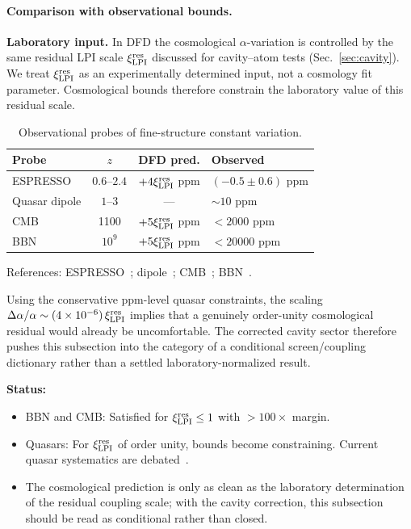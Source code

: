 \paragraph{Comparison with observational bounds.}

\textbf{Laboratory input.}
In DFD the cosmological $\alpha$-variation is controlled by the same residual LPI scale $\xi_{\rm LPI}^{\rm res}$ discussed for cavity--atom tests (Sec.~\ref{sec:cavity}). We treat $\xi_{\rm LPI}^{\rm res}$ as an experimentally determined input, not a cosmology fit parameter. Cosmological bounds therefore constrain the laboratory value of this residual scale.

\begin{table}[h]
\centering
\caption{Observational probes of fine-structure constant variation.}\label{tab:alpha-variation}
\begin{ruledtabular}
\scriptsize
\begin{tabular}{lccl}
\textbf{Probe} & $z$ & \textbf{DFD pred.} & \textbf{Observed} \\
\hline
ESPRESSO & $0.6$--$2.4$ & $+4\xi_{\rm LPI}^{\rm res}$ ppm & $(-0.5 \pm 0.6)$ ppm \\
Quasar dipole & $1$--$3$ & --- & $\sim10$ ppm \\
CMB & 1100 & $+5\xi_{\rm LPI}^{\rm res}$ ppm & $<2000$ ppm \\
BBN & $10^9$ & $+5\xi_{\rm LPI}^{\rm res}$ ppm & $<20000$ ppm \\
\end{tabular}
\end{ruledtabular}
\vspace{1mm}
{\scriptsize References: ESPRESSO~\cite{Murphy2022ESPRESSO}; dipole~\cite{Webb2011,Whitmore2015}; CMB~\cite{Planck2018VI}; BBN~\cite{Cyburt2016}.}
\end{table}

Using the conservative ppm-level quasar constraints, the scaling $\Delta\alpha/\alpha \sim (4\times 10^{-6})\,\xi_{\rm LPI}^{\rm res}$ implies that a genuinely order-unity cosmological residual would already be uncomfortable. The corrected cavity sector therefore pushes this subsection into the category of a conditional screen/coupling dictionary rather than a settled laboratory-normalized result.

\textbf{Status:}
\begin{itemize}
\item BBN and CMB: Satisfied for $\xi_{\rm LPI}^{\rm res} \leq 1$ with $>100\times$ margin.
\item Quasars: For $\xi_{\rm LPI}^{\rm res}$ of order unity, bounds become constraining. Current quasar systematics are debated~\cite{Whitmore2015}.
\item The cosmological prediction is only as clean as the laboratory determination of the residual coupling scale; with the cavity correction, this subsection should be read as conditional rather than closed.
\end{itemize}

